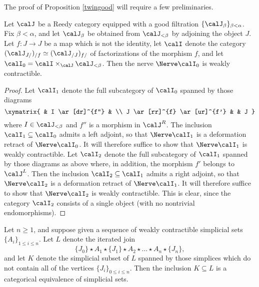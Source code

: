 The proof of Proposition \ref{twingood} will require a few preliminaries.

\begin{lemma}\label{gump1}
Let $\calJ$ be a Reedy category equipped with a good filtration
$\{ \calJ_{\beta} \}_{\beta < \alpha}$. Fix $\beta < \alpha$, and let
$\calJ_{\beta}$ be obtained from $\calJ_{< \beta}$ by adjoining the object $J$.
Let $f: J \rightarrow J$ be a map which is not the identity, let
$\calI$ denote the category $(\calJ_{J/})_{/f} \simeq (\calJ_{/J})_{f/}$ of
factorizations of the morphism $f$, and let $\calI_0 = \calI \times_{\calJ} \calJ_{< \beta}$. Then
the nerve $\Nerve \calI_0$ is weakly contractible.
\end{lemma}

\begin{proof}
Let $\calI_1$ denote the full subcategory of $\calI_0$ spanned by those diagrams
$$ \xymatrix{ & I \ar[dr]^{f''} & \\
J \ar[rr]^{f} \ar[ur]^{f'} & & J }$$
where $I \in \calJ_{< \beta}$ and $f''$ is a morphism in $\calJ^{R}$. The inclusion
$\calI_1 \subseteq \calI_0$ admits a left adjoint, so that $\Nerve \calI_1$ is a deformation retract
of $\Nerve \calI_0$. It will therefore suffice to show that $\Nerve \calI_1$ is weakly contractible.
Let $\calI_2$ denote the full subcategory of $\calI_1$ spanned by those diagrams as above
where, in addition, the morphism $f'$ belongs to $\calJ^{L}$. Then the inclusion
$\calI_2 \subseteq \calI_1$ admits a right adjoint, so that $\Nerve \calI_2$ is a deformation retract of $\Nerve \calI_1$. It will therefore suffice to show that $\Nerve \calI_2$ is weakly contractible. This is clear, since the category $\calI_2$ consists of a single object (with no nontrivial endomorphisms).
\end{proof}

\begin{lemma}\label{gump2}
Let $n \geq 1$, and suppose given a sequence of weakly contractible simplicial sets
$\{ A_i \}_{1 \leq i \leq n}$. Let $L$ denote the iterated join
$$ \{ J_0 \} \star A_1 \star \{J_1 \} \star A_2 \star \ldots \star A_n \star \{J_n \},$$
and let $K$ denote the simplicial subset of $L$ spanned by those simplices which do not contain
all of the vertices $\{ J_i \}_{0 \leq i \leq n}$. Then the inclusion $K \subseteq L$ is a categorical equivalence of simplicial sets.
\end{lemma}

